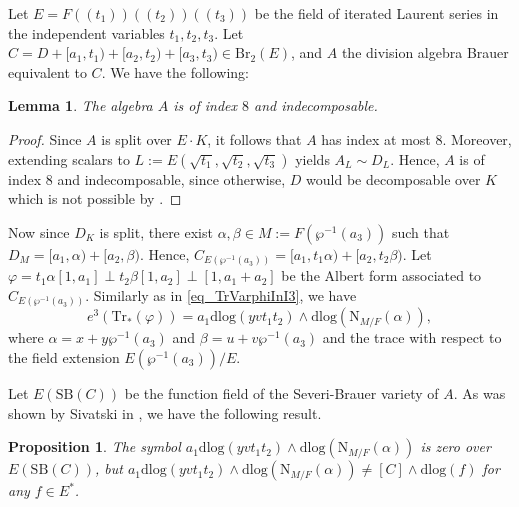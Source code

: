 \documentclass{amsart}
\newtheorem{lemma}[definition]{Lemma}
\newtheorem{proposition}[definition]{Proposition}
\numberwithin{equation}{section}
\newcommand{\dbrac}[1]{(\!(#1)\!)}
\newcommand{\BrTwo}{\mathrm{Br}_2}
\newcommand{\trace}{\mathrm{Tr}}
\newcommand{\norm}{\mathrm{N}}
\newcommand{\dlog}{\mathrm{dlog}}
\newcommand{\SevBrauer}{\mathrm{SB}}
\renewcommand{\phi}{\varphi}
\begin{document}
Let $E = F \dbrac{t_1} \dbrac{t_2} \dbrac{t_3}$ be the field of iterated Laurent series in the independent variables $t_1, t_2, t_3$. 
Let $C = D + [a_1, t_1) + [a_2, t_2) + [a_3,t_3) \in \BrTwo(E)$, and $A$ the division algebra Brauer equivalent to $C$. 
We have the following:
\begin{lemma} \label{lem_AindexIndec} 
	The algebra $A$ is of index $8$ and indecomposable. 
\end{lemma}
\begin{proof}
	Since $A$ is split over $E \cdot K$, it follows that $A$ has index at most $8$. 
	Moreover, extending scalars to $L:=E(\sqrt{t_1}, \sqrt{t_2}, \sqrt{t_3})$ yields $A_L \sim D_L$. 
	Hence, $A$ is of index $8$ and indecomposable, since otherwise, $D$ would be decomposable over $K$ which is not possible by \cite[Lemma 7]{MorandiSethuran_IndecDivisionAlgBaerOrdering}.
\end{proof}

Now since $D_K$ is split, there exist $\alpha, \beta \in M := F(\wp^{-1}(a_3))$ such that $D_M = [a_1,\alpha) + [a_2, \beta)$. 
Hence, $C_{E(\wp^{-1}(a_3))} = [a_1, t_1\alpha) + [a_2, t_2\beta)$. 
Let $\phi = t_1 \alpha [1, a_1] \perp t_2 \beta [1, a_2] \perp [1, a_1+a_2]$ be the Albert form associated to $C_{E(\wp^{-1}(a_3))}$. 
Similarly as in \eqref{eq_TrVarphiInI3}, we have 
\[e^3(\trace_\ast(\phi))=a_1\dlog(yvt_1t_2)\wedge \dlog(\norm_{M/F}(\alpha)),\]
where $\alpha = x + y \wp^{-1}(a_3)$ and $\beta = u + v \wp^{-1}(a_3)$ and the trace with respect to the field extension $E(\wp^{-1}(a_3)) / E$.

Let $E(\SevBrauer(C))$ be the function field of the Severi-Brauer variety of $A$. 
As was shown by Sivatski in \cite[Proposition 4.1]{Sivatski_CohoInv}, we have the following result.

\begin{proposition}\label{PropChow}
	The symbol $a_1\dlog(yvt_1t_2) \wedge \dlog(\norm_{M/F}(\alpha))$ is zero over $E(\SevBrauer(C))$, but $a_1\dlog(yvt_1t_2) \wedge \dlog(\norm_{M/F}(\alpha)) \neq [C] \wedge \dlog(f)$ for any $f\in E^\ast$.
\end{proposition}
\end{document}
